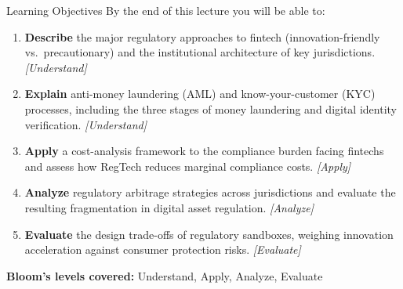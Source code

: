 \begin{frame}{Learning Objectives}
  By the end of this lecture you will be able to:
  \begin{enumerate}
    \item \textbf{Describe} the major regulatory approaches to fintech
          (innovation-friendly vs.\ precautionary) and the institutional
          architecture of key jurisdictions. \hfill\textit{[Understand]}
    \item \textbf{Explain} anti-money laundering (AML) and know-your-customer
          (KYC) processes, including the three stages of money laundering and
          digital identity verification. \hfill\textit{[Understand]}
    \item \textbf{Apply} a cost-analysis framework to the compliance burden
          facing fintechs and assess how RegTech reduces marginal compliance
          costs. \hfill\textit{[Apply]}
    \item \textbf{Analyze} regulatory arbitrage strategies across jurisdictions
          and evaluate the resulting fragmentation in digital asset
          regulation. \hfill\textit{[Analyze]}
    \item \textbf{Evaluate} the design trade-offs of regulatory sandboxes,
          weighing innovation acceleration against consumer protection
          risks. \hfill\textit{[Evaluate]}
  \end{enumerate}
  \vspace{0.5em}
  \textcolor{mlpurple}{\textbf{Bloom's levels covered:}} Understand, Apply, Analyze, Evaluate
\end{frame}

